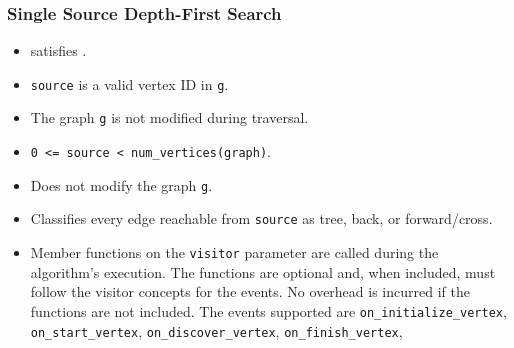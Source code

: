 \subsubsection{Single Source Depth-First Search}

{\small
      
}


%       

\begin{itemdescr}
      \pnum\mandates
            \begin{itemize}
                  \item {} satisfies .
            \end{itemize}
      \pnum\preconditions
            \begin{itemize}
                  \item \lstinline{source} is a valid vertex ID in \lstinline{g}.
                  \item The graph \lstinline{g} is not modified during traversal.
            \end{itemize}
      \pnum\hardprecond
            \begin{itemize}
                  \item
                        \lstinline{0 <= source < num_vertices(graph)}.
            \end{itemize}
      \pnum\effects
            \begin{itemize}
                  \item Does not modify the graph \lstinline{g}.
                  \item Classifies every edge reachable from \lstinline{source} as tree, back, or forward/cross.
                  \item Member functions on the \lstinline{visitor} parameter are called during the algorithm's execution.
                        The functions are optional and, when included, must follow the visitor concepts for the events.
                        No overhead is incurred if the functions are not included.
                        The events supported are \lstinline{on_initialize_vertex}, \lstinline{on_start_vertex},
                        \lstinline{on_discover_vertex}, \lstinline{on_finish_vertex},

\end{itemize}
\end{itemdescr}
